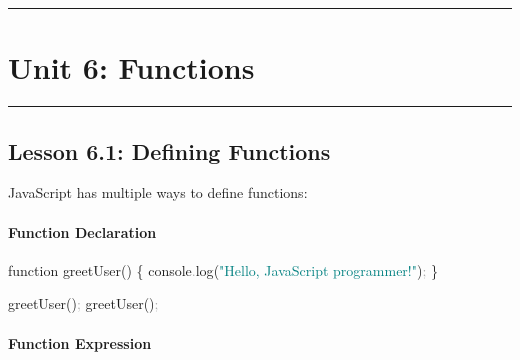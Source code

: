 \documentclass[
  justified,
  openright,
]{tufte-book}
\let\subsubsection\paragraph
\let\paragraph\paragraph
\newcommand{\BuiltInTok}[1]{#1}
\newcommand{\FunctionTok}[1]{\textcolor{BrandBlue}{#1}}
\newcommand{\KeywordTok}[1]{\textcolor{BrandBlue}{#1}}
\newcommand{\NormalTok}[1]{#1}
\newcommand{\OperatorTok}[1]{\textcolor{DarkGray}{#1}}
\newcommand{\SpecialCharTok}[1]{\textcolor{Teal}{#1}}
\newcommand{\StringTok}[1]{\textcolor{Teal}{#1}}
\newcommand{\VerbatimStringTok}[1]{\textcolor{Teal}{#1}}
\newenvironment{Shaded}{%
  \begin{snugshade}
}{%
  \end{snugshade}
}
\let\subsubsection\paragraph
\let\paragraph\paragraph
\begin{document}
\begin{center}\rule{0.5\linewidth}{0.5pt}\end{center}

\section{Unit 6: Functions}\label{unit-6-functions-1}

\begin{center}\rule{0.5\linewidth}{0.5pt}\end{center}

\subsection{Lesson 6.1: Defining
Functions}\label{lesson-6.1-defining-functions}

JavaScript has multiple ways to define functions:

\subsubsection{Function Declaration}\label{function-declaration}

\begin{Shaded}
\begin{Highlighting}[]
\KeywordTok{function} \FunctionTok{greetUser}\NormalTok{() \{}
  \BuiltInTok{console}\OperatorTok{.}\FunctionTok{log}\NormalTok{(}\StringTok{"Hello, JavaScript programmer!"}\NormalTok{)}\OperatorTok{;}
\NormalTok{\}}

\FunctionTok{greetUser}\NormalTok{()}\OperatorTok{;}
\FunctionTok{greetUser}\NormalTok{()}\OperatorTok{;}
\end{Highlighting}
\end{Shaded}

\subsubsection{Function Expression}\label{function-expression}

\begin{Shaded}
\end{Shaded}
\end{document}
